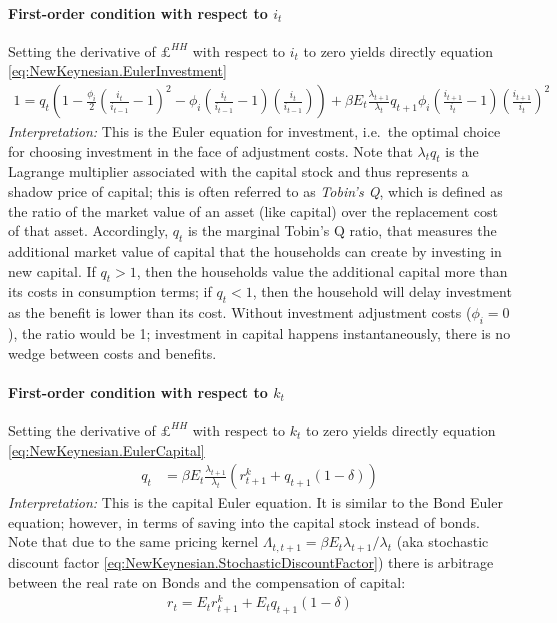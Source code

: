\begin{enumerate}
\paragraph{First-order condition with respect to $i_t$}
Setting the derivative of $\pounds^{HH}$ with respect to $i_t$ to zero yields directly equation \eqref{eq:NewKeynesian.EulerInvestment}
\begin{align*}
1 = q_t \left( 1 - \frac{\phi_i}{2} \left(\frac{i_t}{i_{t-1}}-1\right)^2 - \phi_i \left(\frac{i_t}{i_{t-1}}-1\right)\left(\frac{i_t}{i_{t-1}}\right) \right)
+ \beta E_t \frac{\lambda_{t+1}}{\lambda_t} q_{t+1} \phi_i \left(\frac{i_{t+1}}{i_{t}}-1\right)\left(\frac{i_{t+1}}{i_{t}}\right)^2
\end{align*}
\emph{Interpretation:}
This is the Euler equation for investment,
  i.e.\ the optimal choice for choosing investment in the face of adjustment costs.
Note that $\lambda_t q_t$ is the Lagrange multiplier associated with the capital stock
  and thus represents a shadow price of capital;
  this is often referred to as \emph{Tobin's Q},
  which is defined as the ratio of the market value of an asset (like capital) over the replacement cost of that asset.
Accordingly, $q_t$ is the marginal Tobin's Q ratio,
  that measures the additional market value of capital that the households can create by investing in new capital.
If $q_t>1$, then the households value the additional capital more than its costs in consumption terms;
  if $q_t<1$, then the household will delay investment as the benefit is lower than its cost.
Without investment adjustment costs ($\phi_i=0$), the ratio would be 1;
  investment in capital happens instantaneously, there is no wedge between costs and benefits.

\paragraph{First-order condition with respect to $k_t$}
Setting the derivative of $\pounds^{HH}$ with respect to $k_t$ to zero yields directly equation \eqref{eq:NewKeynesian.EulerCapital}
\begin{align*}
q_t &= \beta E_t \frac{\lambda_{t+1}}{\lambda_t} \left( r^k_{t+1} + q_{t+1}(1-\delta) \right)
\end{align*}
\emph{Interpretation:} This is the capital Euler equation.
It is similar to the Bond Euler equation; however, in terms of saving into the capital stock instead of bonds.
Note that due to the same pricing kernel $\Lambda_{t,t+1} = \beta E_t \lambda_{t+1}/\lambda_t$ (aka stochastic discount factor \eqref{eq:NewKeynesian.StochasticDiscountFactor})
  there is arbitrage between the real rate on Bonds and the compensation of capital:
\begin{align*}
r_t = E_t r^k_{t+1} + E_t q_{t+1}(1-\delta)
\end{align*}


\end{enumerate}
